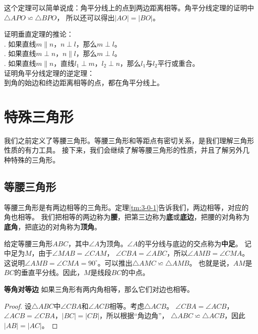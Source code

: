 \documentclass[12pt,UTF8]{ctexbook}
\begin{document}
这个定理可以简单说成：角平分线上的点到两边距离相等。角平分线定理的证明中$\triangle APO \backsimeq \triangle BPO$，
所以还可以得出$|AO| = |BO|$。

\begin{xt}
    证明垂直定理的推论：\\
    . 如果直线$m \parallel n$，$n \perp l$，那么$m \perp l$。\\
    . 如果直线$m \perp n$，$n \parallel l$，那么$m \perp l$。\\
    . 如果直线$m \parallel n$，直线$l_1 \perp m$，$l_2 \perp n$，那么$l_1$与$l_2$平行或重合。\\
    证明角平分线定理的逆定理：\\
    \indent 到角的始边和终边距离相等的点，都在角平分线上。
\end{xt}

\chapter{特殊三角形}
我们之前定义了等腰三角形。等腰三角形和等距点有密切关系，是我们理解三角形性质的有力工具。
接下来，我们会继续了解等腰三角形的性质，并且了解另外几种特殊的三角形。

\section{等腰三角形}
等腰三角形是有两边相等的三角形。定理\ref{tm:3-0-1}告诉我们，两边相等，对应的角也相等。
我们把相等的两边称为\textbf{腰}，把第三边称为\textbf{底}或\textbf{底边}，把腰的对角称为\textbf{底角}，把底边的对角称为\textbf{顶角}。

给定等腰三角形$ABC$，其中$\angle A$为顶角。$\angle A$的平分线与底边的交点称为\textbf{中足}。
记中足为$M$，由于$\angle MAB = \angle CAM$，
$\angle CBA = \angle ABC$，所以$\angle AMB = \angle CMA$。
这说明$\angle AMB = \angle CMA = 90^\circ$。可以推出$\triangle AMC \backsimeq \triangle AMB$。
也就是说，$AM$是$BC$的垂直平分线。因此，$M$是线段$BC$的中点。

\begin{tm}{\textbf{等角对等边}}\label{tm:4-0-0}
    如果三角形有两内角相等，那么它们对边也相等。
\end{tm}
\begin{proof}
    设$\triangle ABC$中$\angle CBA$和$\angle ACB$相等。考虑$\triangle ACB$。
    $\angle CBA = \angle ACB$，$\angle ACB = \angle CBA$，$|BC| = |CB|$，所以根据“角边角”，
    $\triangle ABC \backsimeq \triangle ACB$，因此$|AB| = |AC|$。
\end{proof}
\end{document}
